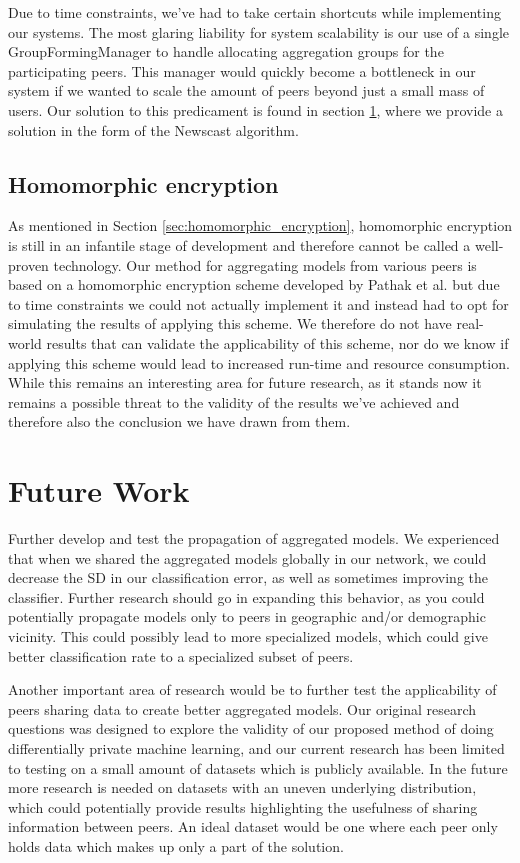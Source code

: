 Due to time constraints, we've had to take certain shortcuts while implementing our systems. The most glaring liability for system scalability is our use of a single GroupFormingManager to handle allocating aggregation groups for the participating peers. This manager would quickly become a bottleneck in our system if we wanted to scale the amount of peers beyond just a small mass of users. Our solution to this predicament is found in section \ref{sec:Future Work}, where we provide a solution in the form of the Newscast algorithm. 

\subsection{Homomorphic encryption}
As mentioned in Section \ref{sec:homomorphic_encryption}, homomorphic encryption is still in an infantile stage of development and therefore cannot be called a well-proven technology. Our method for aggregating models from various peers is based on a homomorphic encryption scheme developed by Pathak et al. but due to time constraints we could not actually implement it and instead had to opt for simulating the results of applying this scheme. We therefore do not have real-world results that can validate the applicability of this scheme, nor do we know if applying this scheme would lead to increased run-time and resource consumption. While this remains an interesting area for future research, as it stands now it remains a possible threat to the validity of the results we've achieved and therefore also the conclusion we have drawn from them.   


\section{Future Work} \label{sec:Future Work}

Further develop and test the propagation of aggregated models. We experienced that when we shared the aggregated models globally in our network, we could decrease the SD in our classification error, as well as sometimes improving the classifier. Further research should go in expanding this behavior, as you could potentially propagate models only to peers in geographic and/or demographic vicinity. This could possibly lead to more specialized models, which could give better classification rate to a specialized subset of peers. 

Another important area of research would be to further test the applicability of peers sharing data to create better aggregated models. Our original research questions was designed to explore the validity of our proposed method of doing differentially private machine learning, and our current research has been limited to testing on a small amount of datasets which is publicly available.  In the future more research is needed on datasets with an uneven underlying distribution, which could potentially provide results highlighting the usefulness of sharing information between peers. An ideal dataset would be one where each peer only holds data which makes up only a part of the solution. 

